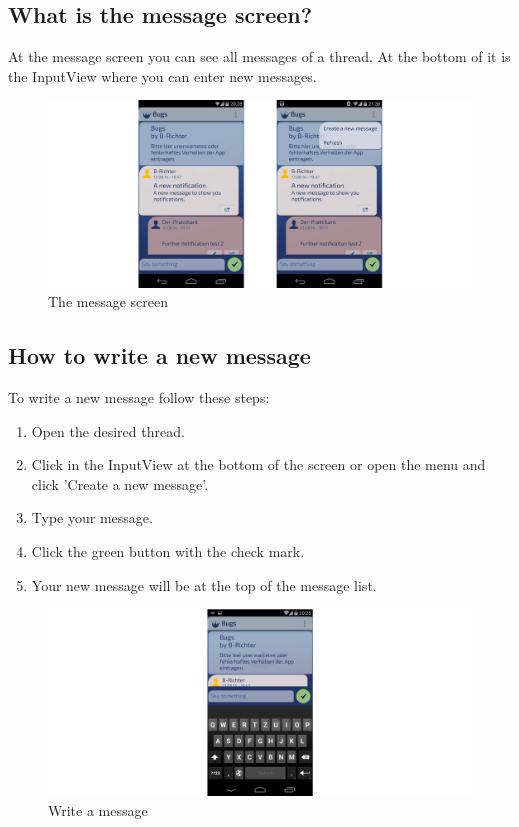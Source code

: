 \documentclass[12pt,a4paper,oneside]{report}
\begin{document}
\subsection{What is the message screen?}
At the message screen you can see all messages of a thread. At the bottom of it is the InputView where you can enter new messages. 

\begin{figure}[!ht]
    \includegraphics[width=\linewidth]{MessageScreen.png}
    \caption{The message screen}
\end{figure}

\subsection{How to write a new message}
To write a new message follow these steps:
\begin{enumerate}
\item Open the desired thread.
\item Click in the InputView at the bottom of the screen or open the menu and click 'Create a new message'.
\item Type your message.
\item Click the green button with the check mark. 
\item Your new message will be at the top of the message list.
\end{enumerate}

\begin{figure}[!ht]
    \includegraphics[width=\linewidth]{WriteMsg.png}
    \caption{Write a message}
\end{figure}
\end{document}

